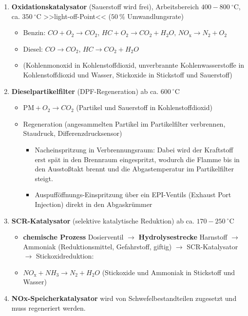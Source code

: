 \begin{enumerate}
\item
  \textbf{Oxidationskatalysator} (Sauerstoff wird frei), Arbeitsbereich
  $400 - 800~^\circ\text{C}$, ca. $350~^\circ\text{C}$
  >>light-off-Point<< ($50~\%$ Umwandlungsrate)

  \begin{itemize}
  \item
    Benzin: $CO + O_2 \to CO_2$, $HC + O_2 \to CO_2 + H_{2}O$,
    $NO_\text{x} \to N_2 + O_2$
  \item
    Diesel: $CO \to CO_2$, $HC \to CO_2 + H_{2}O$
  \item
    (Kohlenmonoxid in Kohlenstoffdioxid, unverbrannte Kohlenwasserstoffe
    in Kohlenstoffdioxid und Wasser, Stickoxide in Stickstoff und
    Sauerstoff)
  \end{itemize}
\item
  \textbf{Dieselpartikelfilter} (DPF-Regeneration) ab ca.
  $600~^\circ\text{C}$

  \begin{itemize}
  \item
    $\text{PM} + O_2 \to CO_{2}$ (Partikel und Sauerstoff in
    Kohlenstoffdioxid)
  \item
    Regeneration (angesammelten Partikel im Partikelfilter verbrennen,
    Staudruck, Differenzdrucksensor)

    \begin{itemize}
    \item
      Nacheinspritzung in Verbrennungsraum: Dabei wird der Kraftstoff
      erst spät in den Brennraum eingespritzt, wodurch die Flamme bis in
      den Ausstoßtakt brennt und die Abgastemperatur im Partikelfilter
      steigt.
    \item
      Auspufföffnungs-Einspritzung über ein EPI-Ventils (Exhaust Port
      Injection) direkt in den Abgaskrümmer
    \end{itemize}
  \end{itemize}
\item
  \textbf{SCR-Katalysator} (selektive katalytische Reduktion) ab ca.
  $170 - 250~^\circ\text{C}$

  \begin{itemize}
  \item
    \textbf{chemische Prozess} Dosierventil $\to$
    \textbf{Hydrolysestrecke} Harnstoff $\to$ Ammoniak
    (Reduktionsmittel, Gefahrstoff, giftig) $\to$ SCR-Katalysator
    $\to$ Stickoxidreduktion:
  \item
    $NO_\text{x} + NH_\text{3} \to N_2 + H_{2}O$ (Stickoxide und
    Ammoniak in Stickstoff und Wasser)
  \end{itemize}
\item
  \textbf{NOx-Speicherkatalysator} wird von Schwefelbestandteilen
  zugesetzt und muss regeneriert werden.
\end{enumerate}

